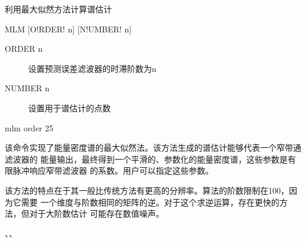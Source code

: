 \label{spe:mlm}

利用最大似然方法计算谱估计

\begin{SACSTX}
MLM [O!RDER! n] [N!UMBER! n]
\end{SACSTX}

\begin{description}
\item [ORDER n] 设置预测误差滤波器的时滞阶数为n
\item [NUMBER n] 设置用于谱估计的点数
\end{description}

\begin{SACDFT}
mlm order 25
\end{SACDFT}

该命令实现了能量密度谱的最大似然法。该方法生成的谱估计能够代表一个窄带通滤波器的
能量输出，最终得到一个平滑的、参数化的能量密度谱，这些参数是有限脉冲响应窄带滤波器
的系数。用户可以指定这些参数。

该方法的特点在于其一般比传统方法有更高的分辨率。算法的阶数限制在100，因为它需要
一个维度与阶数相同的矩阵的逆。对于这个求逆运算，存在更快的方法，但对于大阶数估计
可能存在数值噪声。

、、
